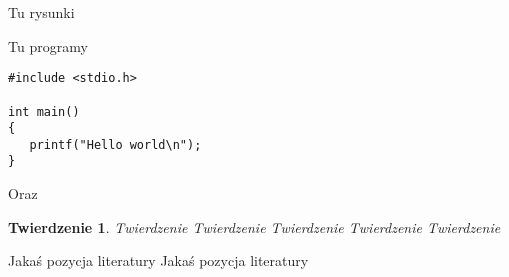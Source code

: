 \documentclass[twoside]{projektInzynierskiMS}
\newtheorem{tw}{Twierdzenie}%
\begin{document}
Tu rysunki


Tu programy

\begin{verbatim}
#include <stdio.h>

int main()
{
   printf("Hello world\n");
}
\end{verbatim}

\noindent
Oraz 

\bigskip

\vrule\hspace{10pt}\begin{minipage}{10cm}
\end{minipage}

\begin{tw}
Twierdzenie Twierdzenie Twierdzenie Twierdzenie Twierdzenie 
\end{tw}
\begin{thebibliography}{12}

 Jakaś pozycja literatury
 Jakaś pozycja literatury

\end{thebibliography}
\end{document}
